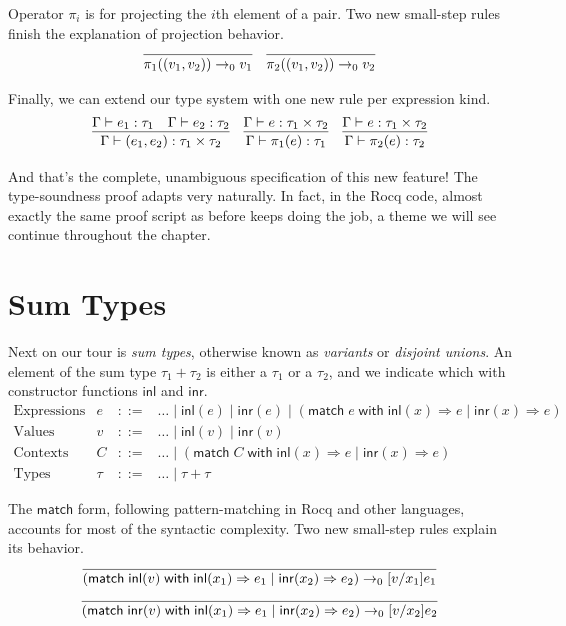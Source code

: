 \documentclass{amsbook}
\theoremstyle{definition}
\theoremstyle{remark}
\numberwithin{section}{chapter}
\numberwithin{equation}{chapter}
\begin{document}
Operator $\pi_i$ is for projecting the $i$th element of a pair.
Two new small-step rules finish the explanation of projection behavior.
$$\infer{\smallstepo{\pi_1((v_1, v_2))}{v_1}}{}
\quad \infer{\smallstepo{\pi_2((v_1, v_2))}{v_2}}{}$$

Finally, we can extend our type system with one new rule per expression kind.
$$\infer{\hasty{\Gamma}{(e_1, e_2)}{\tau_1 \times \tau_2}}{
  \hasty{\Gamma}{e_1}{\tau_1}
  & \hasty{\Gamma}{e_2}{\tau_2}
}
\quad \infer{\hasty{\Gamma}{\pi_1(e)}{\tau_1}}{
  \hasty{\Gamma}{e}{\tau_1 \times \tau_2}
}
\quad \infer{\hasty{\Gamma}{\pi_2(e)}{\tau_2}}{
  \hasty{\Gamma}{e}{\tau_1 \times \tau_2}
}$$

And that's the complete, unambiguous specification of this new feature!
The type-soundness proof adapts very naturally.
In fact, in the Rocq code, almost exactly the same proof script as before keeps doing the job, a theme we will see continue throughout the chapter.

\section{Sum Types}

\newcommand{\inl}[1]{\mathsf{inl}(#1)}
\newcommand{\inr}[1]{\mathsf{inr}(#1)}
\newcommand{\match}[5]{(\mathsf{match} \; #1 \; \mathsf{with} \; \inl{#2} \Rightarrow #3 \mid \inr{#4} \Rightarrow #5)}

Next on our tour is \emph{sum types}, otherwise known as \emph{variants} or \emph{disjoint unions}.
An element of the sum type $\tau_1 + \tau_2$ is either a $\tau_1$ or a $\tau_2$, and we indicate which with constructor functions $\mathsf{inl}$ and $\mathsf{inr}$.
$$\begin{array}{rrcl}
  \textrm{Expressions} & e &::=& \ldots \mid \inl{e} \mid \inr{e} \mid \match{e}{x}{e}{x}{e} \\
  \textrm{Values} & v &::=& \ldots \mid \inl{v} \mid \inr{v} \\
  \textrm{Contexts} & C &::=& \ldots \mid \match{C}{x}{e}{x}{e} \\
  \textrm{Types} & \tau &::=& \ldots \mid \tau + \tau
\end{array}$$

The $\mathsf{match}$ form, following pattern-matching in Rocq and other languages, accounts for most of the syntactic complexity.
Two new small-step rules explain its behavior.
$$\infer{\smallstepo{\match{\inl{v}}{x_1}{e_1}{x_2}{e_2}}{\subst{e_1}{x_1}{v}}}{}$$
$$\infer{\smallstepo{\match{\inr{v}}{x_1}{e_1}{x_2}{e_2}}{\subst{e_2}{x_2}{v}}}{}$$
\end{document}
